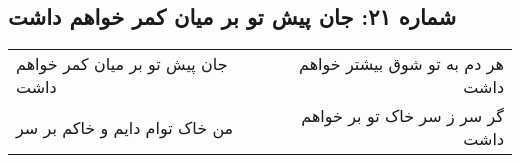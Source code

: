 \begin{center}
\section*{شماره ۲۱: جان پیش تو بر میان کمر خواهم داشت}
\label{sec:021}
\begin{longtable}{l p{0.5cm} r}
جان پیش تو بر میان کمر خواهم داشت
&&
هر دم به تو شوق بیشتر خواهم داشت
\\
من خاک توام دایم و خاکم بر سر
&&
گر سر ز سر خاک تو بر خواهم داشت
\\
\end{longtable}
\end{center}
